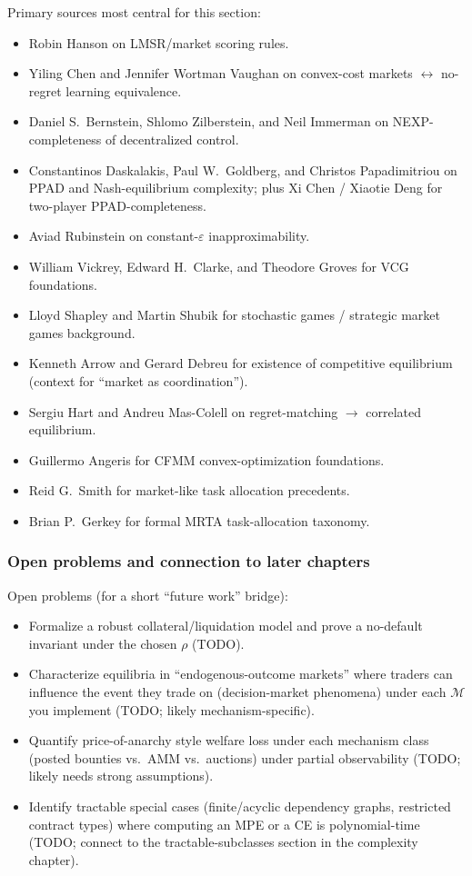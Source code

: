 Primary sources most central for this section:
\begin{itemize}
\item Robin Hanson on LMSR/market scoring rules.
\item Yiling Chen and Jennifer Wortman Vaughan on convex-cost markets \(\leftrightarrow\) no-regret learning equivalence.
\item Daniel S.\ Bernstein, Shlomo Zilberstein, and Neil Immerman on NEXP-completeness of decentralized control.
\item Constantinos Daskalakis, Paul W.\ Goldberg, and Christos Papadimitriou on PPAD and Nash-equilibrium complexity; plus Xi Chen / Xiaotie Deng for two-player PPAD-completeness.
\item Aviad Rubinstein on constant-\(\varepsilon\) inapproximability.
\item William Vickrey, Edward H.\ Clarke, and Theodore Groves for VCG foundations.
\item Lloyd Shapley and Martin Shubik for stochastic games / strategic market games background.
\item Kenneth Arrow and Gerard Debreu for existence of competitive equilibrium (context for ``market as coordination'').
\item Sergiu Hart and Andreu Mas-Colell on regret-matching \(\rightarrow\) correlated equilibrium.
\item Guillermo Angeris for CFMM convex-optimization foundations.
\item Reid G.\ Smith for market-like task allocation precedents.
\item Brian P.\ Gerkey for formal MRTA task-allocation taxonomy.
\end{itemize}

\subsubsection{Open problems and connection to later chapters}

Open problems (for a short ``future work'' bridge):
\begin{itemize}
\item Formalize a robust collateral/liquidation model and prove a no-default invariant under the chosen \(\rho\) (TODO).
\item Characterize equilibria in ``endogenous-outcome markets'' where traders can influence the event they trade on (decision-market phenomena) under each \(\mathcal{M}\) you implement (TODO; likely mechanism-specific).
\item Quantify price-of-anarchy style welfare loss under each mechanism class (posted bounties vs.\ AMM vs.\ auctions) under partial observability (TODO; likely needs strong assumptions).
\item Identify tractable special cases (finite/acyclic dependency graphs, restricted contract types) where computing an MPE or a CE is polynomial-time (TODO; connect to the tractable-subclasses section in the complexity chapter).
\end{itemize}


